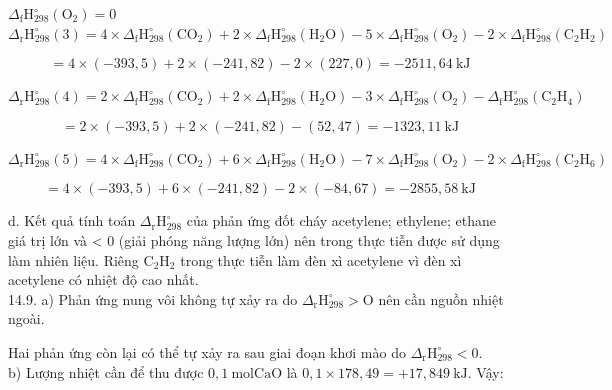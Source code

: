 \documentclass[10pt]{article}
\begin{document}
$\Delta_{\mathrm{f}} \mathrm{H}_{298}^{\circ}\left(\mathrm{O}_{2}\right)=0$\\
$\Delta_{\mathrm{r}} \mathrm{H}_{298}^{\circ}(3)=4 \times \Delta_{\mathrm{f}} \mathrm{H}_{298}^{\circ}\left(\mathrm{CO}_{2}\right)+2 \times \Delta_{\mathrm{f}} \mathrm{H}_{298}^{\circ}\left(\mathrm{H}_{2} \mathrm{O}\right)-5 \times \Delta_{\mathrm{f}} \mathrm{H}_{298}^{\circ}\left(\mathrm{O}_{2}\right)-2 \times \Delta_{\mathrm{f}} \mathrm{H}_{298}^{\circ}\left(\mathrm{C}_{2} \mathrm{H}_{2}\right)$

$$
=4 \times(-393,5)+2 \times(-241,82)-2 \times(227,0)=-2511,64 \mathrm{~kJ}
$$

$\Delta_{\mathrm{r}} \mathrm{H}_{298}^{\circ}(4)=2 \times \Delta_{\mathrm{f}} \mathrm{H}_{298}^{\circ}\left(\mathrm{CO}_{2}\right)+2 \times \Delta_{\mathrm{f}} \mathrm{H}_{298}^{\circ}\left(\mathrm{H}_{2} \mathrm{O}\right)-3 \times \Delta_{\mathrm{f}} \mathrm{H}_{298}^{\circ}\left(\mathrm{O}_{2}\right)-\Delta_{\mathrm{f}} \mathrm{H}_{298}^{\circ}\left(\mathrm{C}_{2} \mathrm{H}_{4}\right)$

$$
=2 \times(-393,5)+2 \times(-241,82)-(52,47)=-1323,11 \mathrm{~kJ}
$$

$\Delta_{\mathrm{r}} \mathrm{H}_{298}^{\circ}(5)=4 \times \Delta_{\mathrm{f}} \mathrm{H}_{298}^{\circ}\left(\mathrm{CO}_{2}\right)+6 \times \Delta_{\mathrm{f}} \mathrm{H}_{298}^{\circ}\left(\mathrm{H}_{2} \mathrm{O}\right)-7 \times \Delta_{\mathrm{f}} \mathrm{H}_{298}^{\circ}\left(\mathrm{O}_{2}\right)-2 \times \Delta_{\mathrm{f}} \mathrm{H}_{298}^{\circ}\left(\mathrm{C}_{2} \mathrm{H}_{6}\right)$

$$
=4 \times(-393,5)+6 \times(-241,82)-2 \times(-84,67)=-2855,58 \mathrm{~kJ}
$$

d. Kết quả tính toán $\Delta_{\mathrm{r}} \mathrm{H}_{298}^{\circ}$ của phản ứng đốt cháy acetylene; ethylene; ethane giá trị lớn và < 0 (giải phóng năng lượng lớn) nên trong thực tiễn được sử dụng làm nhiên liệu. Riêng $\mathrm{C}_{2} \mathrm{H}_{2}$ trong thực tiễn làm đèn xì acetylene vì đèn xì acetylene có nhiệt độ cao nhất.\\
14.9. a) Phản ứng nung vôi không tự xảy ra do $\Delta_{\mathrm{r}} \mathrm{H}_{298}^{\circ}>\mathrm{O}$ nên cần nguồn nhiệt ngoài.

Hai phản ứng còn lại có thể tự xảy ra sau giai đoạn khơi mào do $\Delta_{\mathrm{r}} \mathrm{H}_{298}^{\circ}<0$.\\
b) Lượng nhiệt cần để thu được $0,1 \mathrm{~mol} \mathrm{CaO}$ là $0,1 \times 178,49=+17,849 \mathrm{~kJ}$. Vậy:
\end{document}
